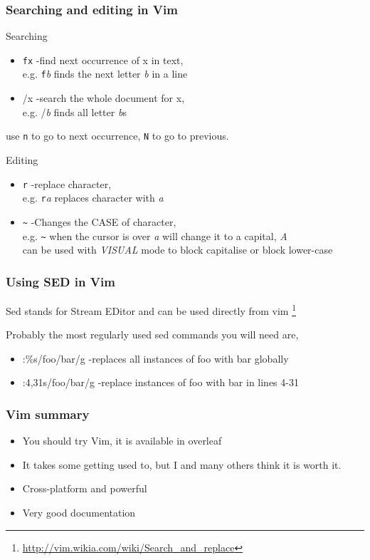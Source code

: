 \documentclass{beamer}
\begin{document}
\begin{frame}
    \frametitle{Searching and editing in Vim}
    Searching
    \begin{itemize}
    \item \texttt{fx} -find next occurrence of x in text,\\ e.g. \texttt{f}\textit{b} finds the next letter \textit{b} in a line 
    \item /x -search the whole document for x,\\ e.g. /\textit{b} finds all letter \textit{b}s
\end{itemize}

use \texttt{n} to go to next occurrence, \texttt{N} to go to previous.

Editing
\begin{itemize}
        \item \texttt{r} -replace character, \\ e.g. \texttt{r}\textit{a} replaces character with \textit{a}
        \item \texttt{\~} -Changes the CASE of character, \\ e.g. \texttt{\~} when the cursor is over \textit{a} will change it to a capital, \textit{A} \\ can be used with \textit{VISUAL} mode to block capitalise or block lower-case
    \end{itemize}
        \end{frame}

\begin{frame}
    \frametitle{Using SED in Vim}
     Sed stands for Stream EDitor and can be used directly from vim \footnote{\url{http://vim.wikia.com/wiki/Search_and_replace}} 

     Probably the most regularly used sed commands you will need are,
     \begin{itemize}
    \item :\%s/foo/bar/g -replaces all instances of foo with bar globally
    \item :4,31s/foo/bar/g -replace instances of foo with bar in lines 4-31 
\end{itemize}
\end{frame}

\begin{frame}
    \frametitle{Vim summary}
    \begin{itemize}
    \item You should try Vim, it is available in overleaf
    \item It takes some getting used to, but I and many others think it is worth it.
    \item Cross-platform and powerful
    \item Very good documentation
    \end{itemize}
\end{frame}
\end{document}

